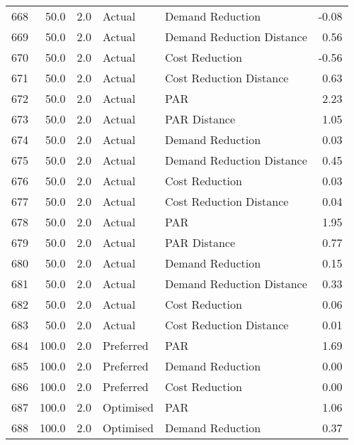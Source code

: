 \begin{longtable}{lrrllr}
668  &         50.0 &     2.0 &         Actual &           Demand Reduction &  -0.08 \\
669  &         50.0 &     2.0 &         Actual &  Demand Reduction Distance &   0.56 \\
670  &         50.0 &     2.0 &         Actual &             Cost Reduction &  -0.56 \\
671  &         50.0 &     2.0 &         Actual &    Cost Reduction Distance &   0.63 \\
672  &         50.0 &     2.0 &         Actual &                        PAR &   2.23 \\
673  &         50.0 &     2.0 &         Actual &               PAR Distance &   1.05 \\
674  &         50.0 &     2.0 &         Actual &           Demand Reduction &   0.03 \\
675  &         50.0 &     2.0 &         Actual &  Demand Reduction Distance &   0.45 \\
676  &         50.0 &     2.0 &         Actual &             Cost Reduction &   0.03 \\
677  &         50.0 &     2.0 &         Actual &    Cost Reduction Distance &   0.04 \\
678  &         50.0 &     2.0 &         Actual &                        PAR &   1.95 \\
679  &         50.0 &     2.0 &         Actual &               PAR Distance &   0.77 \\
680  &         50.0 &     2.0 &         Actual &           Demand Reduction &   0.15 \\
681  &         50.0 &     2.0 &         Actual &  Demand Reduction Distance &   0.33 \\
682  &         50.0 &     2.0 &         Actual &             Cost Reduction &   0.06 \\
683  &         50.0 &     2.0 &         Actual &    Cost Reduction Distance &   0.01 \\
684  &        100.0 &     2.0 &      Preferred &                        PAR &   1.69 \\
685  &        100.0 &     2.0 &      Preferred &           Demand Reduction &   0.00 \\
686  &        100.0 &     2.0 &      Preferred &             Cost Reduction &   0.00 \\
687  &        100.0 &     2.0 &      Optimised &                        PAR &   1.06 \\
688  &        100.0 &     2.0 &      Optimised &           Demand Reduction &   0.37 \\

\end{longtable}
